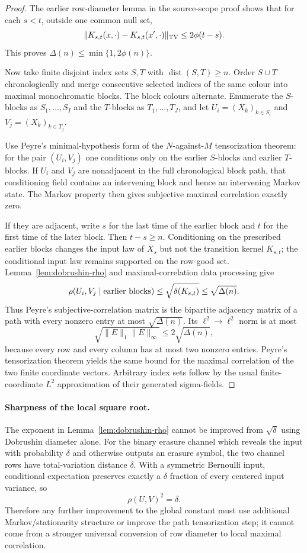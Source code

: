 \begin{proof}
The earlier row-diameter lemma in the source-scope proof shows that for each
$s<t$, outside one common null set,
\[
  \|K_{s,t}(x,\cdot)-K_{s,t}(x',\cdot)\|_{\rm TV}
  \le 2\phi(t-s).
\]
This proves $\Delta(n)\le\min\{1,2\phi(n)\}$.

Now take finite disjoint index sets $S,T$ with $\operatorname{dist}(S,T)\ge n$.
Order $S\cup T$ chronologically and merge consecutive selected indices of the
same colour into maximal monochromatic blocks.  The block colours alternate.
Enumerate the $S$-blocks as $S_1,\dots,S_I$ and the $T$-blocks as
$T_1,\dots,T_J$, and let $U_i=(X_k)_{k\in S_i}$ and
$V_j=(X_k)_{k\in T_j}$.

Use Peyre's minimal-hypothesis form of the $N$-against-$M$ tensorization
theorem: for the pair $(U_i,V_j)$ one conditions only on the earlier
$S$-blocks and earlier $T$-blocks.  If $U_i$ and $V_j$ are nonadjacent in the
full chronological block path, that conditioning field contains an
intervening block and hence an intervening Markov state.  The Markov property
then gives subjective maximal correlation exactly zero.

If they are adjacent, write $s$ for the last time of the earlier block and
$t$ for the first time of the later block.  Then $t-s\ge n$.  Conditioning on
the prescribed earlier blocks changes the input law of $X_s$ but not the
transition kernel $K_{s,t}$; the conditional input law remains supported on
the row-good set.  Lemma~\ref{lem:dobrushin-rho} and maximal-correlation data
processing give
\[
  \rho(U_i,V_j\mid\hbox{earlier blocks})
  \le \sqrt{\delta(K_{s,t})}
  \le \sqrt{\Delta(n)}.
\]
Thus Peyre's subjective-correlation matrix is the bipartite adjacency matrix
of a path with every nonzero entry at most $\sqrt{\Delta(n)}$.  Its
$\ell^2\to\ell^2$ norm is at most
\[
  \sqrt{\|E\|_1\|E\|_\infty}\le 2\sqrt{\Delta(n)},
\]
because every row and every column has at most two nonzero entries.  Peyre's
tensorization theorem yields the same bound for the maximal correlation of
the two finite coordinate vectors.  Arbitrary index sets follow by the usual
finite-coordinate $L^2$ approximation of their generated sigma-fields.
\end{proof}

\paragraph{Sharpness of the local square root.}
The exponent in Lemma~\ref{lem:dobrushin-rho} cannot be improved from
$\sqrt\delta$ using Dobrushin diameter alone.  For the binary erasure channel
which reveals the input with probability $\delta$ and otherwise outputs an
erasure symbol, the two channel rows have total-variation distance $\delta$.
With a symmetric Bernoulli input, conditional expectation preserves exactly
a $\delta$ fraction of every centered input variance, so
\[
  \rho(U,V)^2=\delta.
\]
Therefore any further improvement to the global constant must use additional
Markov/stationarity structure or improve the path tensorization step; it
cannot come from a stronger universal conversion of row diameter to local
maximal correlation.

